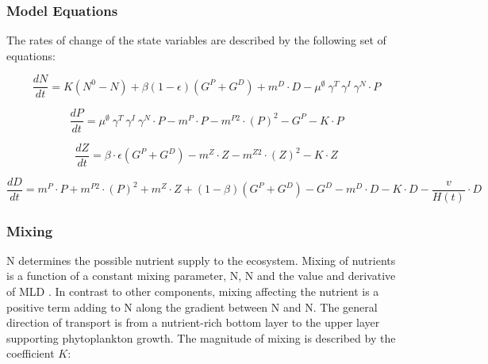 \documentclass[template.tex]{subfiles}
\begin{document}
\subsubsection{Model Equations}
The rates of change of the state variables are described by the following set of equations:

\begin{equation}
    \frac{d N}{d t} = 
    K (N^0 - N) %
    + \beta(1 - \epsilon)(G^P + G^D) %
    + m^D \cdot D %
    - \mu^{\emptyset} \ \gamma^{T} \ \gamma^{I} \ \gamma^{N} \cdot P %
\end{equation}

\begin{equation}
    \frac{d P}{d t} =
    \mu^{\emptyset} \ \gamma^{T} \ \gamma^{I} \ \gamma^{N} \cdot P  %
    - m^P \cdot P %
    - m^{P2} \cdot (P)^2 %
    - G^P %
    - K \cdot P %
\end{equation}

\begin{equation}
    \frac{d Z}{d t} =
    \beta \cdot \epsilon(G^P + G^D) %
    - m^Z \cdot Z %
    - m^{Z2} \cdot (Z)^2 %
    - K \cdot Z %
\end{equation}

\begin{equation}
    \frac{d D}{d t} = 
    m^P \cdot P %
    + m^{P2} \cdot (P)^2 %
    + m^Z \cdot Z %
    + (1 - \beta)(G^P + G^D) %
    - G^D %
    - m^D \cdot D %
    - K \cdot D %
    - \frac{v}{H(t)} \cdot D %
\end{equation}



\subsubsection{Mixing}

\unit{N^\emptyset} determines the possible nutrient supply to the ecosystem. Mixing of nutrients is a function of a constant mixing parameter, \unit{N^\emptyset}, N and the value and derivative of MLD \citep{Evans1985ACycles}. In contrast to other components, mixing affecting the nutrient is a positive term adding to N along the gradient between \unit{N^\emptyset} and N. The general direction of transport is from a nutrient-rich bottom layer to the upper layer supporting phytoplankton growth.
The magnitude of mixing is described by the coefficient $K$:
\end{document}
